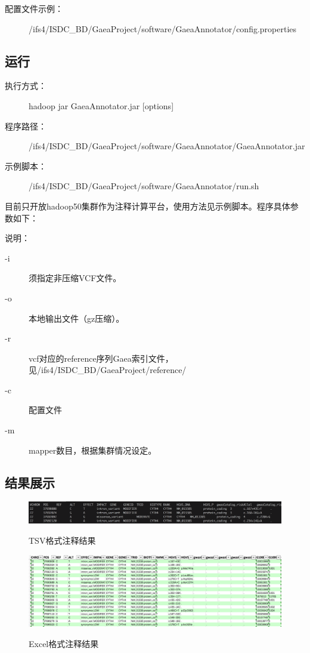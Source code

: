 \documentclass[UTF8,10pt,a4paper]{ctexart}
\begin{document}
\begin{description}
\item[ 配置文件示例：]  /ifs4/ISDC\_BD/GaeaProject/software/GaeaAnnotator/config.properties
\end{description}


\subsection{运行}
\begin{description}
\item[ 执行方式：]  hadoop jar GaeaAnnotator.jar  [options]
\item[ 程序路径：]   /ifs4/ISDC\_BD/GaeaProject/software/GaeaAnnotator/GaeaAnnotator.jar
\item[ 示例脚本：]  /ifs4/ISDC\_BD/GaeaProject/software/GaeaAnnotator/run.sh
\end{description}
目前只开放hadoop50集群作为注释计算平台，使用方法见示例脚本。程序具体参数如下：


说明：
\begin{description}
\item[-i ]  须指定非压缩VCF文件。
\item[-o ] 本地输出文件（gz压缩）。
\item[-r ]  vcf对应的reference序列Gaea索引文件，见/ifs4/ISDC\_BD/GaeaProject/reference/
\item[-c ] 配置文件
\item[-m ]  mapper数目，根据集群情况设定。
\end{description}

\subsection{结果展示}
\begin{figure}[htbp]
\begin{center}
\label{variantType}
\includegraphics[width=15cm]{annoResultsTsv.png}
\caption{TSV格式注释结果}
\end{center}
\end{figure}

\begin{figure}[htbp]
\begin{center}
\label{variantType}
\includegraphics[width=15cm]{annoResults.png}
\caption{Excel格式注释结果}
\end{center}
\end{figure}
\end{document}

